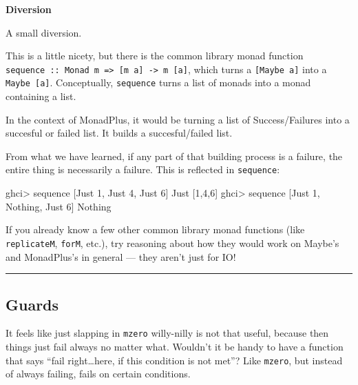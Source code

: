 \documentclass[]{article}
\newenvironment{Shaded}{}{}
\newcommand{\DataTypeTok}[1]{\textcolor[rgb]{0.56,0.13,0.00}{#1}}
\newcommand{\DecValTok}[1]{\textcolor[rgb]{0.25,0.63,0.44}{#1}}
\newcommand{\FunctionTok}[1]{\textcolor[rgb]{0.02,0.16,0.49}{#1}}
\newcommand{\NormalTok}[1]{#1}
\begin{document}
\textbf{Diversion}

A small diversion.

This is a little nicety, but there is the common library monad function
\texttt{sequence\ ::\ Monad\ m\ =\textgreater{}\ {[}m\ a{]}\ -\textgreater{}\ m\ {[}a{]}},
which turns a \texttt{{[}Maybe\ a{]}} into a \texttt{Maybe\ {[}a{]}}.
Conceptually, \texttt{sequence} turns a list of monads into a monad containing a
list.

In the context of MonadPlus, it would be turning a list of Success/Failures into
a succesful or failed list. It builds a succesful/failed list.

From what we have learned, if any part of that building process is a failure,
the entire thing is necessarily a failure. This is reflected in
\texttt{sequence}:

\begin{Shaded}
\begin{Highlighting}[]
\NormalTok{ghci}\FunctionTok{>}\NormalTok{ sequence [}\DataTypeTok{Just} \DecValTok{1}\NormalTok{, }\DataTypeTok{Just} \DecValTok{4}\NormalTok{, }\DataTypeTok{Just} \DecValTok{6}\NormalTok{]}
\DataTypeTok{Just}\NormalTok{ [}\DecValTok{1}\NormalTok{,}\DecValTok{4}\NormalTok{,}\DecValTok{6}\NormalTok{]}
\NormalTok{ghci}\FunctionTok{>}\NormalTok{ sequence [}\DataTypeTok{Just} \DecValTok{1}\NormalTok{, }\DataTypeTok{Nothing}\NormalTok{, }\DataTypeTok{Just} \DecValTok{6}\NormalTok{]}
\DataTypeTok{Nothing}
\end{Highlighting}
\end{Shaded}

If you already know a few other common library monad functions (like
\texttt{replicateM}, \texttt{forM}, etc.), try reasoning about how they would
work on Maybe's and MonadPlus's in general --- they aren't just for IO!

\begin{center}\rule{0.5\linewidth}{\linethickness}\end{center}

\subsection{Guards}\label{guards}

It feels like just slapping in \texttt{mzero} willy-nilly is not that useful,
because then things just fail always no matter what. Wouldn't it be handy to
have a function that says ``fail right\ldots{}here, if this condition is not
met''? Like \texttt{mzero}, but instead of always failing, fails on certain
conditions.
\end{document}
